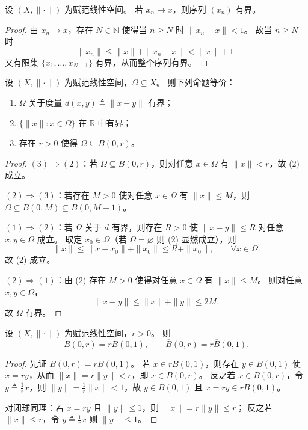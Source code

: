 \documentclass[lang=cn,a4paper,newtx,section]{elegantbook}
\begin{document}
\begin{proposition}\label{prop:convergent-sequence-bounded-normed}
  设 $(X,\|\cdot\|)$ 为赋范线性空间。
  若 $x_n\to x$，则序列 $(x_n)$ 有界。
\end{proposition}

\begin{proof}
  由 $x_n\to x$，存在 $N\in\mathbb{N}$ 使得当 $n\ge N$ 时 $\|x_n-x\|<1$。
  故当 $n\ge N$ 时
  \[
    \|x_n\|\le\|x\|+\|x_n-x\|<\|x\|+1.
  \]
  又有限集 $\{x_1,\dots,x_{N-1}\}$ 有界，从而整个序列有界。
\end{proof}

\begin{proposition}\label{prop:bounded-set-norm-characterization}
  设 $(X,\|\cdot\|)$ 为赋范线性空间，$\Omega\subseteq X$。
  则下列命题等价：
  \begin{enumerate}
    \item $\Omega$ 关于度量 $d(x,y)\triangleq\|x-y\|$ 有界；
    \item $\{\|x\|:x\in\Omega\}$ 在 $\mathbb{R}$ 中有界；
    \item 存在 $r>0$ 使得 $\Omega\subseteq B(0,r)$。
  \end{enumerate}
\end{proposition}

\begin{proof}
  $(3)\Rightarrow(2)$：若 $\Omega\subseteq B(0,r)$，则对任意 $x\in\Omega$ 有 $\|x\|<r$，故 (2) 成立。

  $(2)\Rightarrow(3)$：若存在 $M>0$ 使对任意 $x\in\Omega$ 有 $\|x\|\le M$，则 $\Omega\subseteq \overline{B}(0,M)\subseteq B(0,M+1)$。

  $(1)\Rightarrow(2)$：若 $\Omega$ 关于 $d$ 有界，则存在 $R>0$ 使 $\|x-y\|\le R$ 对任意 $x,y\in\Omega$ 成立。
  取定 $x_0\in\Omega$（若 $\Omega=\varnothing$ 则 (2) 显然成立），则
  \[
    \|x\|\le\|x-x_0\|+\|x_0\|\le R+\|x_0\|,\qquad \forall x\in\Omega.
  \]
  故 (2) 成立。

  $(2)\Rightarrow(1)$：由 (2) 存在 $M>0$ 使得对任意 $x\in\Omega$ 有 $\|x\|\le M$。
  则对任意 $x,y\in\Omega$，
  \[
    \|x-y\|\le\|x\|+\|y\|\le 2M.
  \]
  故 $\Omega$ 有界。
\end{proof}

\begin{remark}\label{rem:ball-scaling}
  设 $(X,\|\cdot\|)$ 为赋范线性空间，$r>0$。
  则
  \[
    B(0,r)=rB(0,1),\qquad \overline{B}(0,r)=r\overline{B}(0,1).
  \]
\end{remark}

\begin{proof}
  先证 $B(0,r)=rB(0,1)$。
  若 $x\in rB(0,1)$，则存在 $y\in B(0,1)$ 使 $x=ry$，从而 $\|x\|=r\|y\|<r$，即 $x\in B(0,r)$。
  反之若 $x\in B(0,r)$，令 $y\triangleq\frac{1}{r}x$，则 $\|y\|=\frac{1}{r}\|x\|<1$，故 $y\in B(0,1)$ 且 $x=ry\in rB(0,1)$。

  对闭球同理：若 $x=ry$ 且 $\|y\|\le1$，则 $\|x\|=r\|y\|\le r$；
  反之若 $\|x\|\le r$，令 $y\triangleq\frac{1}{r}x$ 则 $\|y\|\le1$。
\end{proof}
\end{document}
